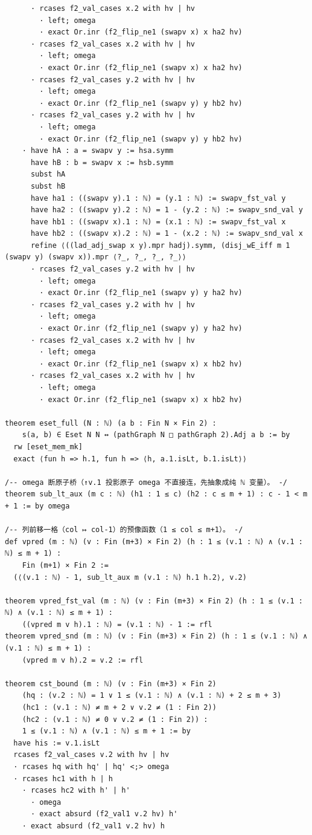 \documentclass[11pt]{article}
\begin{document}
\begin{lstlisting}
      · rcases f2_val_cases x.2 with hv | hv
        · left; omega
        · exact Or.inr (f2_flip_ne1 (swapv x) x ha2 hv)
      · rcases f2_val_cases x.2 with hv | hv
        · left; omega
        · exact Or.inr (f2_flip_ne1 (swapv x) x ha2 hv)
      · rcases f2_val_cases y.2 with hv | hv
        · left; omega
        · exact Or.inr (f2_flip_ne1 (swapv y) y hb2 hv)
      · rcases f2_val_cases y.2 with hv | hv
        · left; omega
        · exact Or.inr (f2_flip_ne1 (swapv y) y hb2 hv)
    · have hA : a = swapv y := hsa.symm
      have hB : b = swapv x := hsb.symm
      subst hA
      subst hB
      have ha1 : ((swapv y).1 : ℕ) = (y.1 : ℕ) := swapv_fst_val y
      have ha2 : ((swapv y).2 : ℕ) = 1 - (y.2 : ℕ) := swapv_snd_val y
      have hb1 : ((swapv x).1 : ℕ) = (x.1 : ℕ) := swapv_fst_val x
      have hb2 : ((swapv x).2 : ℕ) = 1 - (x.2 : ℕ) := swapv_snd_val x
      refine ⟨((lad_adj_swap x y).mpr hadj).symm, (disj_wE_iff m 1 (swapv y) (swapv x)).mpr ⟨?_, ?_, ?_, ?_⟩⟩
      · rcases f2_val_cases y.2 with hv | hv
        · left; omega
        · exact Or.inr (f2_flip_ne1 (swapv y) y ha2 hv)
      · rcases f2_val_cases y.2 with hv | hv
        · left; omega
        · exact Or.inr (f2_flip_ne1 (swapv y) y ha2 hv)
      · rcases f2_val_cases x.2 with hv | hv
        · left; omega
        · exact Or.inr (f2_flip_ne1 (swapv x) x hb2 hv)
      · rcases f2_val_cases x.2 with hv | hv
        · left; omega
        · exact Or.inr (f2_flip_ne1 (swapv x) x hb2 hv)

theorem eset_full (N : ℕ) (a b : Fin N × Fin 2) :
    s(a, b) ∈ Eset N N ↔ (pathGraph N □ pathGraph 2).Adj a b := by
  rw [eset_mem_mk]
  exact ⟨fun h => h.1, fun h => ⟨h, a.1.isLt, b.1.isLt⟩⟩

/-- omega 断原子桥（↑v.1 投影原子 omega 不直接连，先抽象成纯 ℕ 变量）。 -/
theorem sub_lt_aux (m c : ℕ) (h1 : 1 ≤ c) (h2 : c ≤ m + 1) : c - 1 < m + 1 := by omega

/-- 列前移一格（col ↦ col-1）的预像函数（1 ≤ col ≤ m+1）。 -/
def vpred (m : ℕ) (v : Fin (m+3) × Fin 2) (h : 1 ≤ (v.1 : ℕ) ∧ (v.1 : ℕ) ≤ m + 1) :
    Fin (m+1) × Fin 2 :=
  (⟨(v.1 : ℕ) - 1, sub_lt_aux m (v.1 : ℕ) h.1 h.2⟩, v.2)

theorem vpred_fst_val (m : ℕ) (v : Fin (m+3) × Fin 2) (h : 1 ≤ (v.1 : ℕ) ∧ (v.1 : ℕ) ≤ m + 1) :
    ((vpred m v h).1 : ℕ) = (v.1 : ℕ) - 1 := rfl
theorem vpred_snd (m : ℕ) (v : Fin (m+3) × Fin 2) (h : 1 ≤ (v.1 : ℕ) ∧ (v.1 : ℕ) ≤ m + 1) :
    (vpred m v h).2 = v.2 := rfl

theorem cst_bound (m : ℕ) (v : Fin (m+3) × Fin 2)
    (hq : (v.2 : ℕ) = 1 ∨ 1 ≤ (v.1 : ℕ) ∧ (v.1 : ℕ) + 2 ≤ m + 3)
    (hc1 : (v.1 : ℕ) ≠ m + 2 ∨ v.2 ≠ (1 : Fin 2))
    (hc2 : (v.1 : ℕ) ≠ 0 ∨ v.2 ≠ (1 : Fin 2)) :
    1 ≤ (v.1 : ℕ) ∧ (v.1 : ℕ) ≤ m + 1 := by
  have his := v.1.isLt
  rcases f2_val_cases v.2 with hv | hv
  · rcases hq with hq' | hq' <;> omega
  · rcases hc1 with h | h
    · rcases hc2 with h' | h'
      · omega
      · exact absurd (f2_val1 v.2 hv) h'
    · exact absurd (f2_val1 v.2 hv) h


\end{lstlisting}
\end{document}
